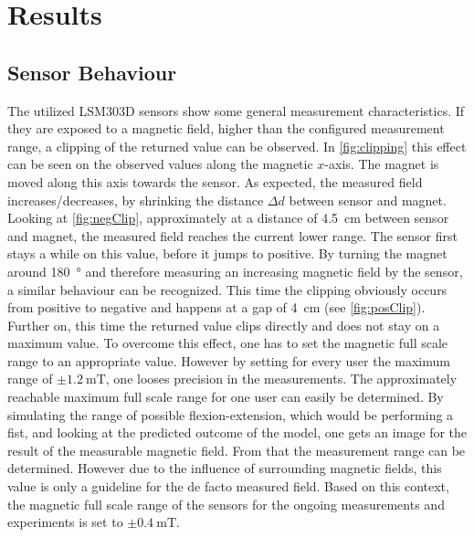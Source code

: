 \lhead[\chaptername~\thechapter]{\rightmark}

\rhead[\leftmark]{}

\lfoot[\thepage]{}

\cfoot{}

\rfoot[]{\thepage}

\chapter{Results} \label{cha:results}

\section{Sensor Behaviour} \label{sec:dataRes}

The utilized LSM303D sensors show some general measurement characteristics. If they are exposed to a magnetic field, higher than the configured measurement range, a clipping of the returned value can be observed. In \ref{fig:clipping} this effect can be seen on the observed values along the magnetic $ x $-axis. The magnet is moved along this axis towards the sensor. As expected, the measured field increases/decreases, by shrinking the distance $ \Delta d $ between sensor and magnet. Looking at \ref{fig:negClip}, approximately at a distance of \SI{4.5}{\cm} between sensor and magnet, the measured field reaches the current lower range. The sensor first stays a while on this value, before it jumps to positive. By turning the magnet around \SI{180}{\degree} and therefore measuring an increasing magnetic field by the sensor, a similar behaviour can be recognized. This time the clipping obviously occurs from positive to negative and happens at a gap of \SI{4}{\cm} (see \ref{fig:posClip}). Further on, this time the returned value clips directly and does not stay on a maximum value. To overcome this effect, one has to set the magnetic full scale range to an appropriate value. However by setting for every user the maximum range of $ \pm \SI{1.2}{\milli \tesla} $, one looses precision in the measurements. The approximately reachable maximum full scale range for one user can easily be determined. By simulating the range of possible flexion-extension, which would be performing a fist, and looking at the predicted outcome of the  model, one gets an image for the result of the measurable magnetic field. From that the measurement range can be determined. However due to the influence of surrounding magnetic fields, this value is only a guideline for the de facto measured field. Based on this context, the magnetic full scale range of the sensors for the ongoing measurements and experiments is set to $ \pm \SI{0.4}{\milli \tesla} $.


